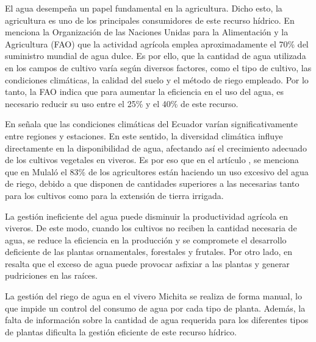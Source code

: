 
El agua desempeña un papel fundamental en la agricultura. Dicho esto, la
agricultura es uno de los principales consumidores de este recurso hídrico. En \cite{noauthor_gestion_2018} menciona la Organización de las
Naciones Unidas para la Alimentación y la Agricultura (FAO) que la actividad
agrícola emplea aproximadamente el 70\% del suministro mundial de agua dulce.
Es por ello, que la cantidad de agua utilizada en los campos de cultivo varía
según diversos factores, como el tipo de cultivo, las condiciones climáticas,
la calidad del suelo y el método de riego empleado. Por lo tanto, la FAO
\cite{noauthor_gestion_2018} indica que para aumentar la eficiencia en el uso
del agua, es necesario reducir su uso entre el 25\% y el 40\% de este recurso.

\bigbreak
En \cite{temperatura_nodate} señala que las condiciones climáticas del Ecuador varían significativamente entre regiones y estaciones. En este sentido, la diversidad climática influye directamente en la disponibilidad de agua, afectando así el crecimiento adecuado de los cultivos vegetales en viveros. Es por eso que en el artículo \cite{c_estudio_2018}, se menciona que en Mulaló el 83\% de los agricultores están haciendo un uso excesivo del agua de riego, debido a que disponen de cantidades superiores a las necesarias tanto para los cultivos como para la extensión de tierra irrigada.

\bigbreak
La gestión ineficiente del agua puede disminuir la productividad agrícola en viveros. De este modo, cuando los cultivos no reciben la cantidad necesaria de agua, se reduce la eficiencia en la producción y se compromete el desarrollo deficiente de las plantas ornamentales, forestales y frutales. Por otro lado, en \cite{luz_cultivo_2014} resalta que el exceso de agua puede provocar asfixiar a las plantas y generar pudriciones en las raíces.

\bigbreak
La gestión del riego de agua en el vivero Michita se realiza de forma manual, lo que impide un control del consumo de agua por cada tipo de planta. Además, la falta de información  sobre la cantidad de agua requerida para los diferentes tipos de plantas dificulta la gestión eficiente de este recurso hídrico. 
